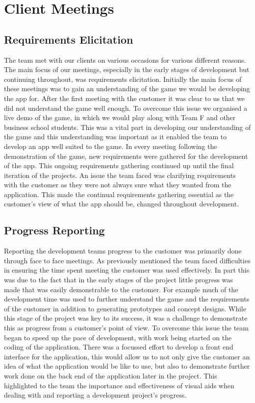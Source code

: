 \documentclass{l3proj}
\begin{document}
\section{Client Meetings}
\label{sec:clientmeeting}
\subsection{Requirements Elicitation}
The team met with our clients on various occasions for various different reasons. The main focus of our meetings, especially in the early stages of development but continuing throughout, was requirements elicitation. Initially the main focus of these meetings was to gain an understanding of the game we would be developing the app for.  After the first meeting with the customer it was clear to us that we did not understand the game well enough. To overcome this issue we organised a live demo of the game, in which we would play along with Team F and other business school students. This was a vital part in developing our understanding of the game and this understanding was important as it enabled the team to develop an app well suited to the game. In every meeting following the demonstration of the game, new requirements were gathered for the development of the app. This ongoing requirements gathering continued up until the final iteration of the projects. An issue the team faced was clarifying requirements with the customer as they were not always sure what they wanted from the application. This made the continual requirements gathering essential as the customer’s view of what the app should be, changed throughout development.

\subsection{Progress Reporting}
Reporting the development teams progress to the customer was primarily done through face to face meetings. As previously mentioned the team faced difficulties in ensuring the time spent meeting the customer was used effectively. In part this was due to the fact that in the early stages of the project little progress was made that was easily demonstrable to the customer. For example much of the development time was used to further understand the game and the requirements of the customer in addition to generating prototypes and concept designs. While this stage of the project was key to its success, it was a challenge to demonstrate this as progress from a customer’s point of view. To overcome this issue the team began to speed up the pace of development, with work being started on the coding of the application. There was a focussed effort to develop a front end interface for the application, this would allow us to not only give the customer an idea of what the application would be like to use, but also to demonstrate further work done on the back end of the application later in the project. This highlighted to the team the importance and effectiveness of visual aids when dealing with and reporting a development project’s progress.
\end{document}
